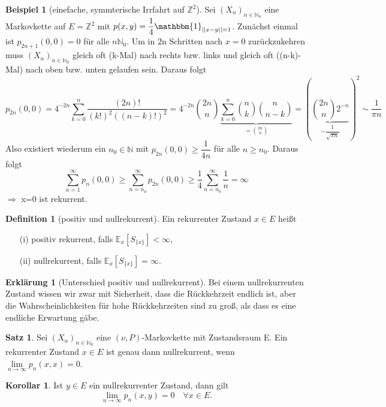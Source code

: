 \documentclass[a4paper,12pt]{scrartcl}
\theoremstyle{definition}
\newtheorem{sat}{Satz}[section]
\newtheorem{kol}{Korollar}[section]
\newtheorem{beti}{Erklärung}[section]
\newtheorem{bsp}{Beispiel}[section]
\newtheorem{defi}{Definition}[section]
\begin{document}
\begin{bsp}[einefache, symmterische Irrfahrt auf $\mathbb{Z}^{2}$]
Sei $(X_{n})_{n \in \mathbb{N}_{0}}$ eine Markovkette auf $E=\mathbb{Z}^2$ mit $p(x,y)=\dfrac{1}{4} \mathbbm{1}_{\vert \vert x-y \vert \vert = 1}$. Zunächst einmal ist $p_{2n+1}(0,0)=0$ für alle $n \mathbb{N}_{0}$. Um in 2n Schritten nach $x=0$ zurückzukehren muss $(X_{n})_{n \in \mathbb{N}_{0}}$ gleich oft (k-Mal) nach rechts bzw. links und gleich oft ((n-k)-Mal) nach oben bzw. unten gelaufen sein. Daraus folgt
\begin{equation*}
p_{2n}(0,0) = 4^{-2n} \sum_{k=0}^{n} \dfrac{(2n)!}{(k!)^{2}((n-k)!)^{2}} = 4^{-2n} \binom{2n}{n} \underbrace{\sum_{k=0}^{n} \binom{n}{k} \binom{n}{n-k}}_{= \binom{2n}{n}} = ({\underbrace{\binom{2n}{n} 2^{-n}}_{\sim \dfrac{1}{\sqrt{\pi n}}}})^{2} \sim \dfrac{1}{\pi n}
\end{equation*}
Also existiert wiederum ein $n_{0} \in \mathbb{N}$ mit $p_{2n}(0,0) \geq \dfrac{1}{4n}$ für alle $n \geq n_{0}$. Daraus folgt 
\begin{equation*}
\sum_{n=1}^{\infty} p_{n}(0,0) \geq \sum_{n = n_{0}}^{\infty} p_{2n}(0,0) \geq \dfrac{1}{4} \sum_{n = n_{0}}^{\infty} \dfrac{1}{n} = \infty
\end{equation*}
$\Rightarrow$ x=0 ist rekurrent.
\end{bsp}
\begin{defi}[positiv und nullrekurrent]
Ein rekurrenter Zustand $x \in E$ heißt
\begin{itemize}
\item[(i)] positiv rekurrent, falls $\mathbb{E}_{x}[S_{\lbrace x \rbrace}] < \infty$,
\item[(ii)] nullrekurrent, falls $\mathbb{E}_{x}[S_{\lbrace x \rbrace}] = \infty$.
\end{itemize}
\end{defi}
\begin{beti}[Unterschied positiv und nullrekurrent]
Bei einem nullrekurrenten Zustand wissen wir zwar mit Sicherheit, dass die Rückkehrzeit endlich ist, aber die Wahrscheinlichkeiten für hohe Rückkehrzeiten sind zu groß, als dass es eine endliche Erwartung gäbe.
\end{beti}
\begin{sat}
\label{nullrekurrent und limes}
Sei $(X_{n})_{n \in \mathbb{N}_{0}}$ eine $(\nu,P)$-Markovkette mit Zustandsraum E. Ein rekurrenter Zustand $x \in E$ ist genau dann nullrekurrent, wenn $\lim \limits_{n \to \infty} p_{n}(x,x) = 0$.
\end{sat}
\begin{kol}
Ist $y \in E$ ein nullrekurrenter Zustand, dann gilt
\begin{equation*}
\lim_{n \to \infty} p_{n}(x,y) = 0 \quad \forall x \in E.
\end{equation*} 
\end{kol}
\end{document}
